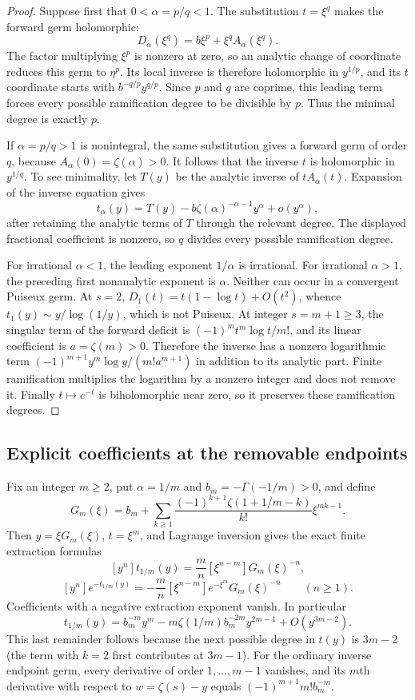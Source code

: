 \begin{proof}
Suppose first that $0<\alpha=p/q<1$.  The substitution $t=\xi^q$
makes the forward germ holomorphic:
\[
 D_\alpha(\xi^q)=b\xi^p+\xi^q A_\alpha(\xi^q).
\]
The factor multiplying $\xi^p$ is nonzero at zero, so an analytic
change of coordinate reduces this germ to $\eta^p$.  Its local inverse
is therefore holomorphic in $y^{1/p}$, and its $t$ coordinate starts
with $b^{-q/p}y^{q/p}$.  Since $p$ and $q$ are coprime, this leading
term forces every possible ramification degree to be divisible by $p$.
Thus the minimal degree is exactly $p$.

If $\alpha=p/q>1$ is nonintegral, the same substitution gives a
forward germ of order $q$, because $A_\alpha(0)=\zeta(\alpha)>0$.
It follows that the inverse $t$ is holomorphic in $y^{1/q}$.  To see
minimality, let $T(y)$ be the analytic inverse of $tA_\alpha(t)$.
Expansion of the inverse equation gives
\[
 t_\alpha(y)=T(y)-b\zeta(\alpha)^{-\alpha-1}y^\alpha+o(y^\alpha),
\]
after retaining the analytic terms of $T$ through the relevant degree.
The displayed fractional coefficient is nonzero, so $q$ divides every
possible ramification degree.

For irrational $\alpha<1$, the leading exponent $1/\alpha$ is
irrational.  For irrational $\alpha>1$, the preceding first
nonanalytic exponent is $\alpha$.  Neither can occur in a convergent
Puiseux germ.  At $s=2$,
$D_1(t)=t(1-\log t)+O(t^2)$, whence
$t_1(y)\sim y/\log(1/y)$, which is not Puiseux.
At integer $s=m+1\ge3$, the singular term of the forward deficit is
$(-1)^m t^m\log t/m!$, and its linear coefficient is $a=\zeta(m)>0$.
Therefore the inverse has a nonzero logarithmic term
$(-1)^{m+1}y^m\log y/(m!a^{m+1})$ in addition to its analytic part.
Finite ramification multiplies the logarithm by a nonzero integer
and does not remove it.
Finally $t\mapsto e^{-t}$ is biholomorphic near zero, so it preserves
these ramification degrees.
\end{proof}

\subsection{Explicit coefficients at the removable endpoints}

Fix an integer $m\ge2$, put $\alpha=1/m$ and $b_m=-\Gamma(-1/m)>0$,
and define
\[
 G_m(\xi)=b_m+\sum_{k\ge1}
 \frac{(-1)^{k+1}\zeta(1+1/m-k)}{k!}\xi^{mk-1}.
\]
Then $y=\xi G_m(\xi)$, $t=\xi^m$, and Lagrange inversion gives
the exact finite extraction formulas
\[
 [y^n]t_{1/m}(y)=\frac mn[\xi^{n-m}]G_m(\xi)^{-n},
\]
\[
 [y^n]e^{-t_{1/m}(y)}
 =-\frac mn[\xi^{n-m}]e^{-\xi^m}G_m(\xi)^{-n}\qquad(n\ge1).
\]
Coefficients with a negative extraction exponent vanish.  In particular
\[
 t_{1/m}(y)=b_m^{-m}y^m
 -m\zeta(1/m)b_m^{-2m}y^{2m-1}+O(y^{3m-2}).
\]
This last remainder follows because the next possible degree in
$t(y)$ is $3m-2$ (the term with $k=2$ first contributes at $3m-1$).
For the ordinary inverse endpoint germ, every derivative of order
$1,\ldots,m-1$ vanishes, and its $m$th derivative with respect to
$w=\zeta(s)-y$ equals
$(-1)^{m+1}m!b_m^{-m}$.

